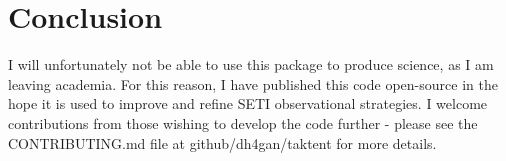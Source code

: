 \documentclass[RNAAS]{aastex62}
\begin{document}
\section{Conclusion}

\noindent I will unfortunately not be able to use this package to produce science, as I am leaving academia.  For this reason, I have published this code open-source in the hope it is used to improve and refine SETI observational strategies.  I welcome contributions from those wishing to develop the code further - please see the CONTRIBUTING.md file at github/dh4gan/taktent for more details.



\acknowledgments



\end{document}
